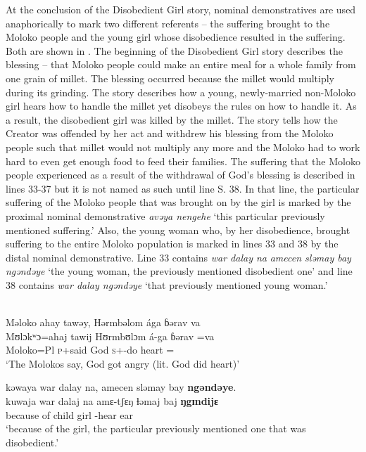 At the conclusion of the Disobedient Girl story, nominal demonstratives are used anaphorically to mark two different referents -- the suffering brought to the Moloko people and the young girl whose disobedience resulted in the suffering. Both are shown in . The beginning of the Disobedient Girl story describes the blessing -- that Moloko people could make an entire meal for a whole family from one grain of millet. The blessing occurred because the millet would multiply during its grinding. The story describes how a young, newly-married non-Moloko girl hears how to handle the millet yet disobeys the rules on how to handle it. As a result, the disobedient girl was killed by the millet. The story tells how the Creator was offended by her act and withdrew his blessing from the Moloko people such that millet would not multiply any more and the Moloko had to work hard to even get enough food to feed their families. The suffering that the Moloko people experienced as a result of the withdrawal of God’s blessing is described in lines 33-37 but it is not named as such until line S. 38. In that line, the particular suffering of the Moloko people that was brought on by the girl is marked by the proximal nominal demonstrative \textit{avəya nengehe} ‘this particular previously mentioned suffering.' Also, the young woman who, by her disobedience, brought suffering to the entire Moloko population is marked in lines 33 and 38 by the distal nominal demonstrative. Line 33 contains \textit{war dalay na} \textit{amecen sləmay bay} \textit{ngəndəye} ‘the young woman, the previously mentioned disobedient one’ and line 38 contains \textit{war dalay ngəndəye} ‘that previously mentioned young woman.’

\ea \label{ex:3:50} \\
      Məloko  ahay  tawəy,  Hərmbəlom  ága  ɓərav  va  \\
\gll  Mʊlɔkʷɔ=ahaj tawij Hʊrmbʊlɔm á-ga ɓərav =va     \\
      Moloko=Pl \textsc{p}+said God \textsc{s}+{\IFV}-do heart ={\PRF}      \\
      \glt  ‘The Molokos say, God got angry (lit. God did heart)’ \\
      
\medskip

kəwaya  war  dalay  na,  amecen  sləmay  bay \textbf{ngəndəye}. \\   
\gll kuwaja        war    dalaj     na   amɛ-tʃɛŋ      ɬəmaj  baj \textbf{ŋgɪndijɛ}\\
     {because of}  child    girl    {\PSP}  {\DEP}-hear   ear      {\NEG}  {\DEM}\\
\glt ‘because of the girl, the particular previously mentioned one that was disobedient.’\\

